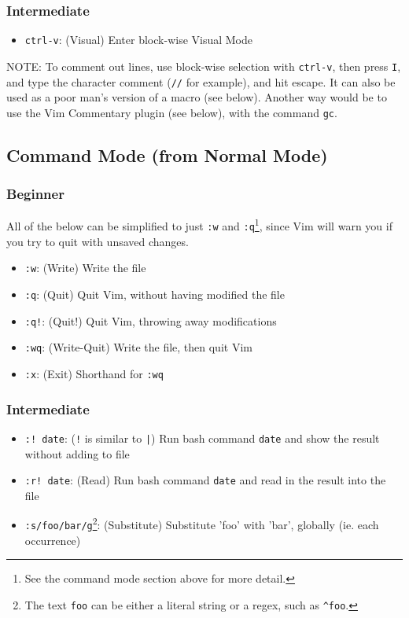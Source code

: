 \documentclass[11pt]{article}
\begin{document}
\subsubsection{Intermediate}
\label{sec:orgcbdebcf}
\begin{itemize}
\item \texttt{ctrl-v}: (Visual) Enter block-wise Visual Mode
\end{itemize}

NOTE: To comment out lines, use block-wise selection with \texttt{ctrl-v}, then press
\texttt{I}, and type the character comment (\texttt{//} for example), and hit escape. It can
also be used as a poor man's version of a macro (see below). Another way would
be to use the Vim Commentary plugin (see below), with the command \texttt{gc}.
\subsection{Command Mode (from Normal Mode)}
\label{sec:orgc8f95dd}
\subsubsection{Beginner}
\label{sec:orgbd4765b}
All of the below can be simplified to just \texttt{:w} and \texttt{:q}\footnote{See the command mode section above for more detail.}, since Vim will warn
you if you try to quit with unsaved changes.

\begin{itemize}
\item \texttt{:w}: (Write) Write the file
\item \texttt{:q}: (Quit) Quit Vim, without having modified the file
\item \texttt{:q!}: (Quit!) Quit Vim, throwing away modifications
\item \texttt{:wq}: (Write-Quit) Write the file, then quit Vim
\item \texttt{:x}: (Exit) Shorthand for \texttt{:wq}
\end{itemize}
\subsubsection{Intermediate}
\label{sec:org8ffac94}
\begin{itemize}
\item \texttt{:! date}: (\texttt{!} is similar to \texttt{|}) Run bash command \texttt{date} and show the result without adding to file
\item \texttt{:r! date}: (Read) Run bash command \texttt{date} and read in the result into the file
\item \texttt{:s/foo/bar/g}\footnote{The text \texttt{foo} can be either a literal string or a regex, 
such as \texttt{\textasciicircum{}foo}.}: (Substitute) Substitute 'foo' with 'bar', globally (ie. each occurrence)
\end{itemize}
\end{document}
